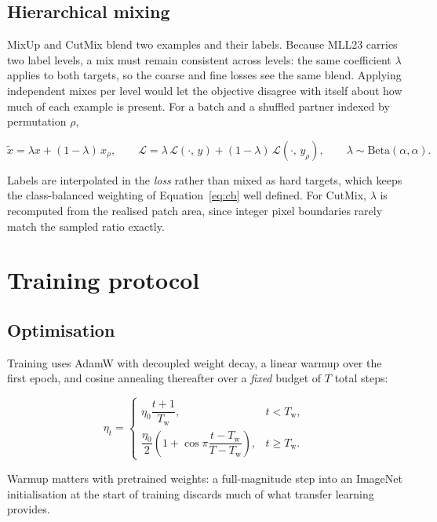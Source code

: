 \documentclass[11pt,a4paper]{article}
\begin{document}
\subsection{Hierarchical mixing}

MixUp and CutMix blend two examples and their labels. Because MLL23 carries two
label levels, a mix must remain consistent across levels: the same coefficient
$\lambda$ applies to both targets, so the coarse and fine losses see the same
blend. Applying independent mixes per level would let the objective disagree with
itself about how much of each example is present. For a batch and a shuffled
partner indexed by permutation $\rho$,

\begin{equation}
  \tilde{x} = \lambda x + (1-\lambda)\,x_{\rho},
  \qquad
  \mathcal{L} = \lambda\,\mathcal{L}(\cdot,\, y) + (1-\lambda)\,\mathcal{L}(\cdot,\, y_{\rho}),
  \qquad \lambda \sim \mathrm{Beta}(\alpha, \alpha).
  \label{eq:mix}
\end{equation}

Labels are interpolated in the \emph{loss} rather than mixed as hard targets,
which keeps the class-balanced weighting of Equation~\eqref{eq:cb} well defined.
For CutMix, $\lambda$ is recomputed from the realised patch area, since integer
pixel boundaries rarely match the sampled ratio exactly.

\section{Training protocol}

\subsection{Optimisation}

Training uses AdamW with decoupled weight decay, a linear warmup over the first
epoch, and cosine annealing thereafter over a \emph{fixed} budget of $T$ total
steps:

\begin{equation}
  \eta_t = \begin{cases}
    \eta_0 \dfrac{t+1}{T_{\text{w}}}, & t < T_{\text{w}},\\[2ex]
    \dfrac{\eta_0}{2}\left(1 + \cos\pi\dfrac{t - T_{\text{w}}}{T - T_{\text{w}}}\right), & t \ge T_{\text{w}}.
  \end{cases}
  \label{eq:lr}
\end{equation}

Warmup matters with pretrained weights: a full-magnitude step into an ImageNet
initialisation at the start of training discards much of what transfer learning
provides.
\end{document}
